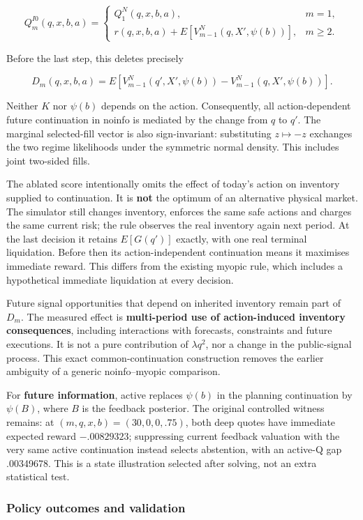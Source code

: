 \documentclass[
  10pt,
  a4paper,
]{article}
\begin{document}
\[
Q_m^{I0}(q,x,b,a)=
\begin{cases}
Q_1^N(q,x,b,a),&m=1,\\
r(q,x,b,a)+E[V_{m-1}^N(q,X',\psi(b))],&m\ge2.
\end{cases}
\]

Before the last step, this deletes precisely

\[
D_m(q,x,b,a)=E[V_{m-1}^N(q',X',\psi(b))-
V_{m-1}^N(q,X',\psi(b))].
\]

Neither \(K\) nor \(\psi(b)\) depends on the action. Consequently, all
action-dependent future continuation in noinfo is mediated by the change
from \(q\) to \(q'\). The marginal selected-fill vector is also
sign-invariant: substituting \(z\mapsto-z\) exchanges the two regime
likelihoods under the symmetric normal density. This includes joint
two-sided fills.

The ablated score intentionally omits the effect of today's action on
inventory supplied to continuation. It is \textbf{not} the optimum of an
alternative physical market. The simulator still changes inventory,
enforces the same safe actions and charges the same current risk; the
rule observes the real inventory again next period. At the last decision
it retains \(E[G(q')]\) exactly, with one real terminal liquidation.
Before then its action-independent continuation means it maximises
immediate reward. This differs from the existing myopic rule, which
includes a hypothetical immediate liquidation at every decision.

Future signal opportunities that depend on inherited inventory remain
part of \(D_m\). The measured effect is \textbf{multi-period use of
action-induced inventory consequences}, including interactions with
forecasts, constraints and future executions. It is not a pure
contribution of \(\lambda q^2\), nor a change in the public-signal
process. This exact common-continuation construction removes the earlier
ambiguity of a generic noinfo--myopic comparison.

For \textbf{future information}, active replaces \(\psi(b)\) in the
planning continuation by \(\psi(B)\), where \(B\) is the feedback
posterior. The original controlled witness remains: at
\((m,q,x,b)=(30,0,0,.75)\), both deep quotes have immediate expected
reward \(-.00829323\); suppressing current feedback valuation with the
very same active continuation instead selects abstention, with an
active-Q gap .00349678. This is a state illustration selected after
solving, not an extra statistical test.

\subsubsection{Policy outcomes and
validation}\label{policy-outcomes-and-validation}
\end{document}
